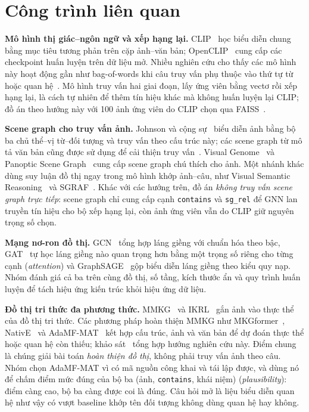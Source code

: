 \documentclass[conference]{IEEEtran}
\begin{document}
\section{Công trình liên quan}\label{sec:rel}
\textbf{Mô hình thị giác--ngôn ngữ và xếp hạng lại.}
CLIP~\cite{clip} học biểu diễn chung bằng mục tiêu tương phản trên cặp ảnh--văn bản; OpenCLIP~\cite{openclip} cung cấp các checkpoint huấn luyện trên dữ liệu mở. Nhiều nghiên cứu cho thấy các mô hình này hoạt động gần như bag-of-words khi câu truy vấn phụ thuộc vào thứ tự từ hoặc quan hệ~\cite{bagofwords,winoground}. Mô hình truy vấn hai giai đoạn, lấy ứng viên bằng vectơ rồi xếp hạng lại, là cách tự nhiên để thêm tín hiệu khác mà không huấn luyện lại CLIP; đồ án theo hướng này với 100 ảnh ứng viên do CLIP chọn qua FAISS~\cite{faiss}.

\textbf{Scene graph cho truy vấn ảnh.}
Johnson và cộng sự~\cite{sgret} biểu diễn ảnh bằng bộ ba chủ thể--vị từ--đối tượng và truy vấn theo cấu trúc này; các scene graph từ mô tả văn bản cũng được sử dụng để cải thiện truy vấn~\cite{semanticsg}. Visual Genome~\cite{vg} và Panoptic Scene Graph~\cite{psg} cung cấp scene graph chú thích cho ảnh. Một nhánh khác dùng suy luận đồ thị ngay trong mô hình khớp ảnh--câu, như Visual Semantic Reasoning~\cite{vsrn} và SGRAF~\cite{sgraf}. Khác với các hướng trên, đồ án \emph{không truy vấn scene graph trực tiếp}: scene graph chỉ cung cấp cạnh \texttt{contains} và \texttt{sg\_rel} để GNN lan truyền tín hiệu cho bộ xếp hạng lại, còn ảnh ứng viên vẫn do CLIP giữ nguyên trọng số chọn.

\textbf{Mạng nơ-ron đồ thị.}
GCN~\cite{gcn} tổng hợp láng giềng với chuẩn hóa theo bậc, GAT~\cite{gat} tự học láng giềng nào quan trọng hơn bằng một trọng số riêng cho từng cạnh (\emph{attention}) và GraphSAGE~\cite{sage} gộp biểu diễn láng giềng theo kiểu quy nạp. Nhóm đánh giá cả ba trên cùng đồ thị, số tầng, kích thước ẩn và quy trình huấn luyện để tách hiệu ứng kiến trúc khỏi hiệu ứng dữ liệu.

\textbf{Đồ thị tri thức đa phương thức.}
MMKG~\cite{mmkg} và IKRL~\cite{ikrl} gắn ảnh vào thực thể của đồ thị tri thức. Các phương pháp hoàn thiện MMKG như MKGformer~\cite{mkgformer}, NativE~\cite{native} và AdaMF-MAT~\cite{adamf} kết hợp cấu trúc, ảnh và văn bản để dự đoán thực thể hoặc quan hệ còn thiếu; khảo sát~\cite{survey} tổng hợp hướng nghiên cứu này. Điểm chung là chúng giải bài toán \emph{hoàn thiện đồ thị}, không phải truy vấn ảnh theo câu. Nhóm chọn AdaMF-MAT vì có mã nguồn công khai và tái lập được, và dùng nó để chấm điểm mức đúng của bộ ba (ảnh, \texttt{contains}, khái niệm) (\emph{plausibility}): điểm càng cao, bộ ba càng được coi là đúng. Câu hỏi mở là liệu biểu diễn quan hệ như vậy có vượt baseline khớp tên đối tượng không dùng quan hệ hay không.
\end{document}
